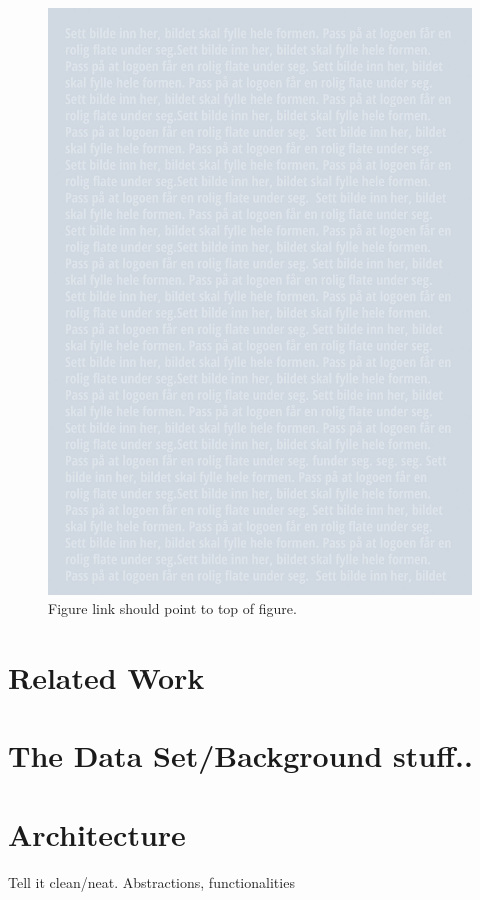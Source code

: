 \documentclass[USenglish]{uit-thesis}
\begin{document}
\begin{figure}
\centering
\includegraphics[scale=0.1]{example_image.jpg}
\caption{Figure link should point to top of figure.}
\label{fig:ex}
\end{figure}

\fi


\chapter{Related Work}

\chapter{The Data Set/Background stuff..}

\chapter{Architecture}
Tell it clean/neat. Abstractions, functionalities
\end{document}
